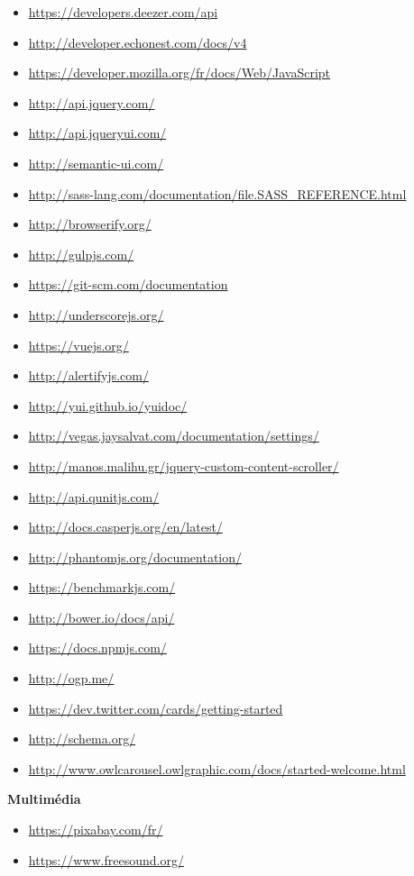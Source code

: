 \documentclass[a4paper,12pt]{article}
\begin{document}
\begin{itemize}
 \item{\url{https://developers.deezer.com/api}}
 \item{\url{http://developer.echonest.com/docs/v4}}
 \item{\url{https://developer.mozilla.org/fr/docs/Web/JavaScript}}
 \item{\url{http://api.jquery.com/}}
 \item{\url{http://api.jqueryui.com/}}
 \item{\url{http://semantic-ui.com/}}
 \item{\url{http://sass-lang.com/documentation/file.SASS_REFERENCE.html}}
 \item{\url{http://browserify.org/}}
 \item{\url{http://gulpjs.com/}}
 \item{\url{https://git-scm.com/documentation}}
 \item{\url{http://underscorejs.org/}}
 \item{\url{https://vuejs.org/}}
 \item{\url{http://alertifyjs.com/}}
 \item{\url{http://yui.github.io/yuidoc/}}
 \item{\url{http://vegas.jaysalvat.com/documentation/settings/}}
 \item{\url{http://manos.malihu.gr/jquery-custom-content-scroller/}}
 \item{\url{http://api.qunitjs.com/}}
 \item{\url{http://docs.casperjs.org/en/latest/}}
 \item{\url{http://phantomjs.org/documentation/}}
 \item{\url{https://benchmarkjs.com/}}
 \item{\url{http://bower.io/docs/api/}}
 \item{\url{https://docs.npmjs.com/}}
 \item{\url{http://ogp.me/}}
 \item{\url{https://dev.twitter.com/cards/getting-started}}
 \item{\url{http://schema.org/}}
 \item{\url{http://www.owlcarousel.owlgraphic.com/docs/started-welcome.html}}
\end{itemize}

\textbf{Multimédia}

\begin{itemize}
 \item{\url{https://pixabay.com/fr/}}
 \item{\url{https://www.freesound.org/}}
\end{itemize}
\end{document}
